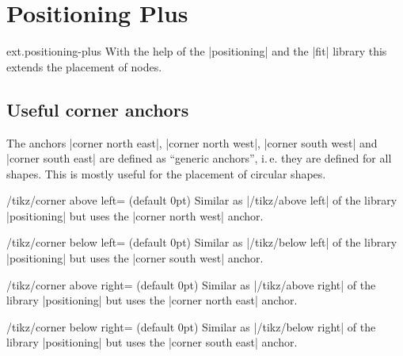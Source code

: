 %
%
%
\clearpage
\section{Positioning Plus}
\label{library:positioning-plus}
\begin{tikzlibrary}{ext.positioning-plus}
  With the help of the |positioning| and the |fit| library this extends the placement of nodes.
\end{tikzlibrary}

\subsection{Useful corner anchors}
The anchors |corner north east|, |corner north west|, |corner south west| and |corner south east|
are defined as ``generic anchors'', i.\,e. they are defined for all shapes.
This is mostly useful for the placement of circular shapes.
\begin{stylekey}{/tikz/corner above left= (default 0pt)}
  Similar as |/tikz/above left| of the \tikzname\space library |positioning|
  but uses the |corner north west| anchor.
\end{stylekey}
\begin{stylekey}{/tikz/corner below left= (default 0pt)}
  Similar as |/tikz/below left| of the \tikzname\space library |positioning|
  but uses the |corner south west| anchor.
\end{stylekey}
\begin{stylekey}{/tikz/corner above right= (default 0pt)}
  Similar as |/tikz/above right| of the \tikzname\space library |positioning|
  but uses the |corner north east| anchor.
\end{stylekey}
\begin{stylekey}{/tikz/corner below right= (default 0pt)}
  Similar as |/tikz/below right| of the \tikzname\space library |positioning|
  but uses the |corner south east| anchor.
\end{stylekey}

